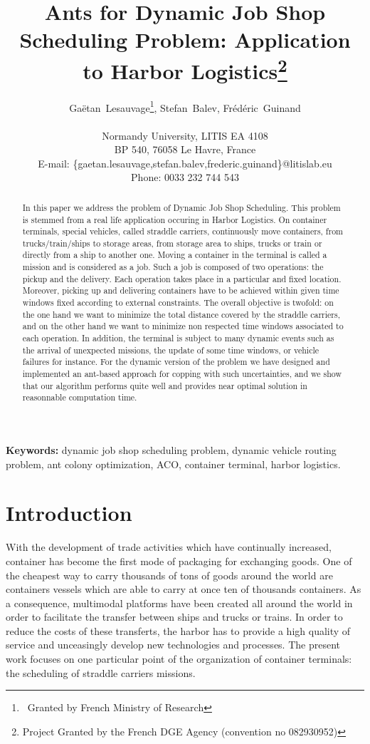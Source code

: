 \documentclass[a4paper,10pt]{article}
\title{Ants for Dynamic Job Shop Scheduling Problem: Application to Harbor Logistics\thanks{Project Granted by the French DGE Agency (convention no 082930952)}}
\author{Ga\"{e}tan~Lesauvage\thanks{~Granted by French Ministry of Research}, Stefan~Balev, Fr\'{e}d\'{e}ric~Guinand\\\\
\medskip
Normandy University, LITIS EA 4108\\
BP 540, 76058 Le Havre, France\\
\medskip
E-mail: \{gaetan.lesauvage,stefan.balev,frederic.guinand\}@litislab.eu\\
\medskip
Phone: 0033 232 744 543
}
\begin{document}
\maketitle


\begin{abstract}
In this paper we address the problem of Dynamic Job Shop Scheduling. This problem is stemmed from a real life application occuring in Harbor Logistics. On container terminals, special vehicles, called straddle carriers, continuously move containers, from trucks/train/ships to storage areas, from storage area to ships, trucks or train or directly from a ship to another one. Moving a container in the terminal is called a mission and is considered as a job. Such a job is composed of two operations: the pickup and the delivery. Each operation takes place in a particular and fixed location. Moreover, picking up and delivering containers have to be achieved within given time windows fixed according to external constraints. The overall objective is twofold: on the one hand we want to minimize the total distance covered by the straddle carriers, and on the other hand we want to minimize non respected time windows associated to each operation. 
In addition, the terminal is subject to many dynamic events such as the arrival of unexpected missions, the update of some time windows, or vehicle failures for instance. For the dynamic version of the problem we have designed and implemented an ant-based approach for copping with such uncertainties, and we show that our algorithm performs quite well and provides near optimal solution in reasonnable computation time.
\end{abstract}

{\bf Keywords: } dynamic job shop scheduling problem, dynamic vehicle routing problem, ant colony optimization, ACO, container terminal, harbor logistics.\\

\section{Introduction}

With the development of trade activities which have continually increased, container has become the first mode of packaging for exchanging goods. One of the cheapest way to carry thousands of tons of goods around the world are containers vessels which are able to carry at once ten of thousands containers. As a consequence, multimodal platforms have been created all around the world in order to facilitate the transfer between ships and trucks or trains. In order to reduce the costs of these transferts, the harbor has to provide a high quality of service and unceasingly develop new technologies and processes. The present work focuses on one particular point of the organization of container terminals: the scheduling of straddle carriers missions.\\
\end{document}
